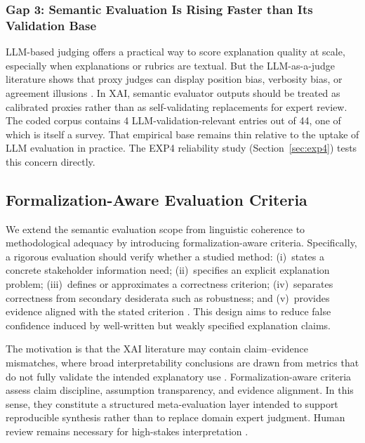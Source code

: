 \documentclass[10pt,a4paper,twoside]{article}
\begin{document}
\subsubsection{Gap 3: Semantic Evaluation Is Rising Faster than Its Validation Base}

LLM-based judging offers a practical way to score explanation quality at
scale, especially when explanations or rubrics are textual. But the
LLM-as-a-judge literature shows that proxy judges can display position
bias, verbosity bias, or agreement illusions
\citep{zheng2023judging,gu2024llmjudge}. In XAI, semantic evaluator
outputs should be treated as calibrated proxies rather than as
self-validating replacements for expert review. The coded corpus contains
4 LLM-validation-relevant entries out of 44, one of which is itself a survey.
That empirical base remains thin relative to the uptake of LLM evaluation
in practice.
The EXP4 reliability study (Section~\ref{sec:exp4}) tests this concern
directly.


\subsection{Formalization-Aware Evaluation Criteria}
\label{sec:formalization_aware}

We extend the semantic evaluation scope from linguistic coherence to
methodological adequacy by introducing formalization-aware criteria.
Specifically, a rigorous evaluation should verify whether a studied method:
(i)~states a concrete stakeholder information need; (ii)~specifies an
explicit explanation problem; (iii)~defines or approximates a correctness
criterion; (iv)~separates correctness from secondary desiderata such as
robustness; and (v)~provides evidence aligned with the stated criterion
\citep{haufe2026formalization,sokol2020factsheets}. This design aims to
reduce false confidence induced by well-written but weakly specified
explanation claims.

The motivation is that the XAI literature may contain claim--evidence
mismatches, where broad interpretability conclusions are drawn from metrics
that do not fully validate the intended explanatory use
\citep{haufe2026formalization,hedstrom2023quantus}. Formalization-aware
criteria assess claim discipline, assumption transparency, and evidence
alignment. In this sense, they constitute a structured meta-evaluation
layer intended to support reproducible synthesis rather than to replace
domain expert judgment. Human review remains necessary for high-stakes
interpretation \citep{bucinca2020proxy,bansal2021whole,fok2023verifiability}.
\end{document}
